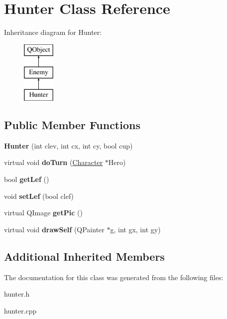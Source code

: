 \hypertarget{class_hunter}{\section{Hunter Class Reference}
\label{class_hunter}
}
Inheritance diagram for Hunter\-:\begin{figure}[H]
\begin{center}
\leavevmode
\includegraphics[height=3.000000cm]{class_hunter}
\end{center}
\end{figure}
\subsection*{Public Member Functions}
\begin{DoxyCompactItemize}
\item 
\hypertarget{class_hunter_a6516ea26662db6188fa2102ae768eca2}{{\bfseries Hunter} (int clev, int cx, int cy, bool cup)}\label{class_hunter_a6516ea26662db6188fa2102ae768eca2}

\item 
\hypertarget{class_hunter_a910f2c34961a3d7fb1caa91e65b5d743}{virtual void {\bfseries do\-Turn} (\hyperlink{class_character}{Character} $\ast$Hero)}\label{class_hunter_a910f2c34961a3d7fb1caa91e65b5d743}

\item 
\hypertarget{class_hunter_adc1727098c026b726430a638d4536970}{bool {\bfseries get\-Lef} ()}\label{class_hunter_adc1727098c026b726430a638d4536970}

\item 
\hypertarget{class_hunter_ac1cb95a730a5af30d4fe50b1ff296696}{void {\bfseries set\-Lef} (bool clef)}\label{class_hunter_ac1cb95a730a5af30d4fe50b1ff296696}

\item 
\hypertarget{class_hunter_a407e130c2e904630fd501c329eaeac77}{virtual Q\-Image {\bfseries get\-Pic} ()}\label{class_hunter_a407e130c2e904630fd501c329eaeac77}

\item 
\hypertarget{class_hunter_a765f282edf2fd27998740d33ed81a423}{virtual void {\bfseries draw\-Self} (Q\-Painter $\ast$g, int gx, int gy)}\label{class_hunter_a765f282edf2fd27998740d33ed81a423}

\end{DoxyCompactItemize}
\subsection*{Additional Inherited Members}


The documentation for this class was generated from the following files\-:\begin{DoxyCompactItemize}
\item 
hunter.\-h\item 
hunter.\-cpp\end{DoxyCompactItemize}
